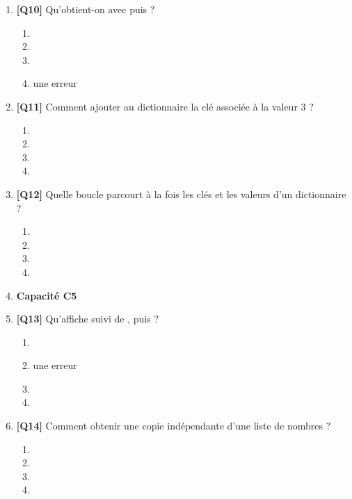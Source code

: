 \begin{enumerate}
\item \textbf{[Q10]} Qu'obtient-on avec  puis  ?
  \begin{enumerate}[label=\Alph*.]
    \item {}
    \item {}
    \item {}
    \item une erreur 
  \end{enumerate}

\item \textbf{[Q11]} Comment ajouter au dictionnaire  la clé  associée à la valeur $3$ ?
  \begin{enumerate}[label=\Alph*.]
    \item {}
    \item {}
    \item {}
    \item {}
  \end{enumerate}

\item \textbf{[Q12]} Quelle boucle parcourt à la fois les clés et les valeurs d'un dictionnaire  ?
  \begin{enumerate}[label=\Alph*.]
    \item {}
    \item {}
    \item {}
    \item {}
  \end{enumerate}

\item[] \textbf{Capacité C5}

\item \textbf{[Q13]} Qu'affiche  suivi de ,  puis  ?
  \begin{enumerate}[label=\Alph*.]
    \item \code{[1, 2]}
    \item une erreur
    \item \code{[3]}
    \item \code{[1, 2, 3]}
  \end{enumerate}

\item \textbf{[Q14]} Comment obtenir une copie indépendante d'une liste  de nombres ?
  \begin{enumerate}[label=\Alph*.]
    \item {}
    \item {}
    \item {}
    \item {}
  \end{enumerate}


\end{enumerate}
